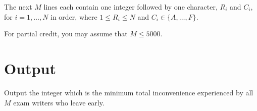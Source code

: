 The next $M$ lines each contain one integer followed by one character, $R_i$ and $C_i$, for $i =
1, \ldots, N$ in order, where $1 \leq R_i \leq N$ and $C_i \in \{A, \ldots, F\}$.

For partial credit, you may assume that $M \leq 5000$.

\section*{Output}
Output the integer which is the minimum total inconvenience experienced by all $M$ exam writers who
leave early.
